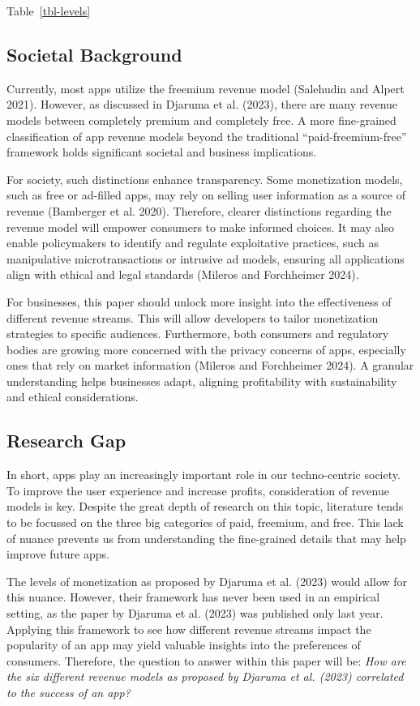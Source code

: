 \documentclass[
  12pt,
  a4paper,
]{article}
\begin{document}
Table~\ref{tbl-levels}

\subsection{Societal Background}\label{societal-background}

Currently, most apps utilize the freemium revenue model (Salehudin and
Alpert 2021). However, as discussed in Djaruma et al. (2023), there are
many revenue models between completely premium and completely free. A
more fine-grained classification of app revenue models beyond the
traditional ``paid-freemium-free'' framework holds significant societal
and business implications.

For society, such distinctions enhance transparency. Some monetization
models, such as free or ad-filled apps, may rely on selling user
information as a source of revenue (Bamberger et al. 2020). Therefore,
clearer distinctions regarding the revenue model will empower consumers
to make informed choices. It may also enable policymakers to identify
and regulate exploitative practices, such as manipulative
microtransactions or intrusive ad models, ensuring all applications
align with ethical and legal standards (Mileros and Forchheimer 2024).

For businesses, this paper should unlock more insight into the
effectiveness of different revenue streams. This will allow developers
to tailor monetization strategies to specific audiences. Furthermore,
both consumers and regulatory bodies are growing more concerned with the
privacy concerns of apps, especially ones that rely on market
information (Mileros and Forchheimer 2024). A granular understanding
helps businesses adapt, aligning profitability with sustainability and
ethical considerations.

\subsection{Research Gap}\label{research-gap}

In short, apps play an increasingly important role in our techno-centric
society. To improve the user experience and increase profits,
consideration of revenue models is key. Despite the great depth of
research on this topic, literature tends to be focussed on the three big
categories of paid, freemium, and free. This lack of nuance prevents us
from understanding the fine-grained details that may help improve future
apps.

The levels of monetization as proposed by Djaruma et al. (2023) would
allow for this nuance. However, their framework has never been used in
an empirical setting, as the paper by Djaruma et al. (2023) was
published only last year. Applying this framework to see how different
revenue streams impact the popularity of an app may yield valuable
insights into the preferences of consumers. Therefore, the question to
answer within this paper will be: \emph{How are the six different
revenue models as proposed by Djaruma et al. (2023) correlated to the
success of an app?}
\end{document}

